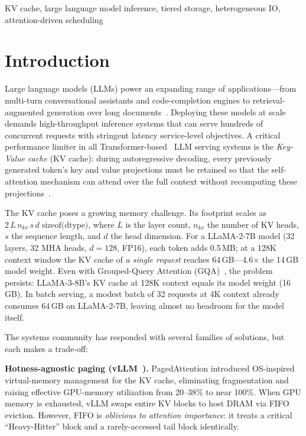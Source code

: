 \documentclass[conference]{IEEEtran}
\begin{document}
\begin{IEEEkeywords}
KV cache, large language model inference, tiered storage, heterogeneous IO, attention-driven scheduling
\end{IEEEkeywords}

\section{Introduction}

Large language models (LLMs) power an expanding range of applications---from multi-turn conversational assistants and code-completion engines to retrieval-augmented generation over long documents~\cite{llama2,llama3}. Deploying these models at scale demands high-throughput inference systems that can serve hundreds of concurrent requests with stringent latency service-level objectives. A critical performance limiter in all Transformer-based~\cite{transformer} LLM serving systems is the \emph{Key-Value cache} (KV cache): during autoregressive decoding, every previously generated token's key and value projections must be retained so that the self-attention mechanism can attend over the full context without recomputing these projections~\cite{vllm}.

The KV cache poses a growing memory challenge. Its footprint scales as $2\,L\,n_{kv}\,s\,d\;\text{sizeof(dtype)}$, where $L$ is the layer count, $n_{kv}$ the number of KV heads, $s$ the sequence length, and $d$ the head dimension. For a LLaMA-2-7B model (32 layers, 32 MHA heads, $d{=}128$, FP16), each token adds 0.5\,MB; at a 128K context window the KV cache of \emph{a single request} reaches 64\,GB---4.6$\times$ the 14\,GB model weight. Even with Grouped-Query Attention (GQA)~\cite{gqa}, the problem persists: LLaMA-3-8B's KV cache at 128K context equals its model weight (16\,GB). In batch serving, a modest batch of 32 requests at 4K context already consumes 64\,GB on LLaMA-2-7B, leaving almost no headroom for the model itself.


The systems community has responded with several families of solutions, but each makes a trade-off:

\textbf{Hotness-agnostic paging (vLLM~\cite{vllm}).} PagedAttention introduced OS-inspired virtual-memory management for the KV cache, eliminating fragmentation and raising effective GPU-memory utilization from 20--38\% to near 100\%. When GPU memory is exhausted, vLLM swaps entire KV blocks to host DRAM via FIFO eviction. However, FIFO is \emph{oblivious to attention importance}: it treats a critical ``Heavy-Hitter'' block and a rarely-accessed tail block identically.
\end{document}
